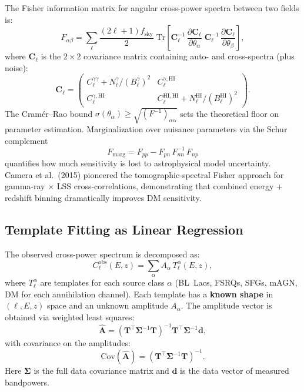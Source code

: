 \documentclass[10pt,a4paper]{article}
\newcommand{\Cl}{C_\ell}
\newcommand{\fsky}{f_{\mathrm{sky}}}
\begin{document}
The Fisher information matrix for angular cross-power spectra between two fields is:
\begin{equation}
F_{\alpha\beta}
= \sum_\ell \frac{(2\ell+1)\fsky}{2}\;
\mathrm{Tr}\!\left[
\mathbf{C}_\ell^{-1}\, \frac{\partial \mathbf{C}_\ell}{\partial \theta_\alpha}\;
\mathbf{C}_\ell^{-1}\, \frac{\partial \mathbf{C}_\ell}{\partial \theta_\beta}
\right],
\label{eq:fisher}
\end{equation}
where $\mathbf{C}_\ell$ is the $2\times 2$ covariance matrix containing auto- and cross-spectra (plus noise):
\begin{equation}
\mathbf{C}_\ell = \begin{pmatrix}
\Cl^{\gamma\gamma} + N_\ell^\gamma/(B_\ell^\gamma)^2 & \Cl^{\gamma,\mathrm{HI}} \\
\Cl^{\gamma,\mathrm{HI}} & \Cl^{\mathrm{HI,HI}} + N_\ell^{\mathrm{HI}}/(B_\ell^{\mathrm{HI}})^2
\end{pmatrix}.
\end{equation}
The Cram\'er--Rao bound $\sigma(\theta_\alpha) \geq \sqrt{(F^{-1})_{\alpha\alpha}}$ sets the theoretical floor on parameter estimation. Marginalization over nuisance parameters via the Schur complement
\begin{equation}
F_{\mathrm{marg}} = F_{pp} - F_{pn}\, F_{nn}^{-1}\, F_{np}
\end{equation}
quantifies how much sensitivity is lost to astrophysical model uncertainty. Camera et al.\ (2015) pioneered the tomographic-spectral Fisher approach for gamma-ray $\times$ LSS cross-correlations, demonstrating that combined energy + redshift binning dramatically improves DM sensitivity.


\subsection{Template Fitting as Linear Regression}

The observed cross-power spectrum is decomposed as:
\begin{equation}
\Cl^{\mathrm{obs}}(E, z)
= \sum_\alpha A_\alpha\, T_\ell^\alpha(E, z),
\label{eq:template_fit}
\end{equation}
where $T_\ell^\alpha$ are templates for each source class $\alpha$ (BL~Lacs, FSRQs, SFGs, mAGN, DM for each annihilation channel). Each template has a \textbf{known shape} in $(\ell, E, z)$ space and an unknown amplitude $A_\alpha$. The amplitude vector is obtained via weighted least squares:
\begin{equation}
\hat{\mathbf{A}} = \left(\mathbf{T}^\top \bm{\Sigma}^{-1} \mathbf{T}\right)^{-1}
\mathbf{T}^\top \bm{\Sigma}^{-1} \mathbf{d},
\label{eq:wls}
\end{equation}
with covariance on the amplitudes:
\begin{equation}
\mathrm{Cov}(\hat{\mathbf{A}}) = \left(\mathbf{T}^\top \bm{\Sigma}^{-1} \mathbf{T}\right)^{-1}.
\label{eq:wls_cov}
\end{equation}
Here $\bm{\Sigma}$ is the full data covariance matrix and $\mathbf{d}$ is the data vector of measured bandpowers.
\end{document}
